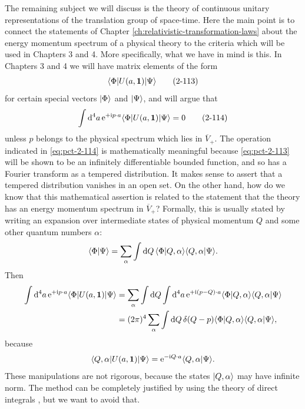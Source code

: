The remaining subject we will discuss is the theory of continuous unitary
representations of the translation group of space-time.  Here the main point
is to connect the statements of Chapter \ref{ch:relativistic-transformation-laws} about the energy momentum spectrum
of a physical theory to the criteria which will be used in Chapters 3 and 4.
More specifically, what we have in mind is this.  In Chapters 3 and 4 we will
have matrix elements of the form
\begin{equation}
  \langle \Phi\vert U(a,\mathbf{1})\vert \Psi\rangle
  \tag{2-113}\label{eq:pct-2-113}
\end{equation}
for certain special vectors $\lvert \Phi\rangle$ and $\lvert \Psi\rangle$, and will argue
that
\begin{equation}
  \int \mathop{}\!\mathrm{d}^4a\,\mathrm{e}^{+\mathrm{i} p\cdot a}
  \langle \Phi\vert U(a,\mathbf{1})\vert \Psi\rangle=0
  \tag{2-114}\label{eq:pct-2-114}
\end{equation}
unless $p$ belongs to the physical spectrum which lies in $\overline{V}_{+}$.
The operation indicated in \eqref{eq:pct-2-114} is mathematically meaningful because
\eqref{eq:pct-2-113} will be shown to be an infinitely differentiable bounded function,
and so has a Fourier transform as a tempered distribution.  It makes sense
to assert that a tempered distribution vanishes in an open set.  On the other
hand, how do we know that this mathematical assertion is related to the
statement that the theory has an energy momentum spectrum in $\overline{V}_{+}$?
Formally, this is usually stated by writing an expansion over intermediate
states of physical momentum $Q$ and some other quantum numbers $\alpha$:
\begin{equation*}
  \langle \Phi\vert \Psi\rangle
  =\sum_{\alpha}\int\mathop{}\!\mathrm{d} Q\,
  \langle \Phi\vert Q,\alpha\rangle\langle Q,\alpha\vert \Psi\rangle.
\end{equation*}
Then
\begin{align*}
  \int\mathop{}\!\mathrm{d}^4a\,\mathrm{e}^{+\mathrm{i} p\cdot a}
  \langle \Phi\vert U(a,\mathbf{1})\vert \Psi\rangle
  &=\sum_{\alpha}\int\mathop{}\!\mathrm{d} Q\int\mathop{}\!\mathrm{d}^4a\,
  \mathrm{e}^{+\mathrm{i}(p-Q)\cdot a}
  \langle \Phi\vert Q,\alpha\rangle\langle Q,\alpha\vert \Psi\rangle\\
  &=(2\pi)^4\sum_{\alpha}\int\mathop{}\!\mathrm{d} Q\,
  \delta(Q-p)\langle \Phi\vert Q,\alpha\rangle\langle Q,\alpha\vert \Psi\rangle,
\end{align*}
because
\begin{equation*}
  \langle Q,\alpha\vert U(a,\mathbf{1})\vert \Psi\rangle
  =\mathrm{e}^{-\mathrm{i} Q\cdot a}\langle Q,\alpha\vert \Psi\rangle.
\end{equation*}
These manipulations are not rigorous, because the states $\lvert Q,\alpha\rangle$
may have infinite norm.  The method can be completely justified by using the
theory of direct integrals \cite{pct-22}, but we want to avoid that.

